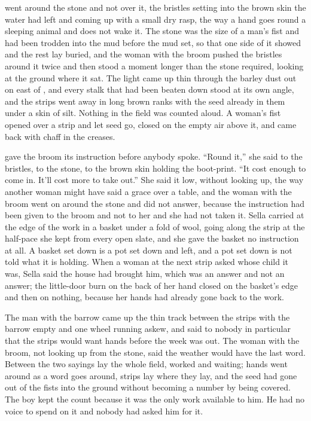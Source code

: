 
 went around the stone and not over it, the bristles setting into the brown skin the water had left and coming up with a small dry rasp, the way a hand goes round a sleeping animal and does not wake it. The stone was the size of a man's fist and had been trodden into the mud before the mud set, so that one side of it showed and the rest lay buried, and the woman with the broom pushed the bristles around it twice and then stood a moment longer than the stone required, looking at the ground where it sat. The light came up thin through the barley dust out on  east of , and every stalk that had been beaten down stood at its own angle, and the strips went away in long brown ranks with the seed already in them under a skin of silt. Nothing in the field was counted aloud. A woman's fist opened over a strip and let seed go, closed on the empty air above it, and came back with chaff in the creases.

 gave the broom its instruction before anybody spoke. “Round it,” she said to the bristles, to the stone, to the brown skin holding the boot-print. “It cost enough to come in. It'll cost more to take out.” She said it low, without looking up, the way another woman might have said a grace over a table, and the woman with the broom went on around the stone and did not answer, because the instruction had been given to the broom and not to her and she had not taken it. Sella carried  at the edge of the work in a basket under a fold of wool, going along the strip at the half-pace she kept from every open slate, and she gave the basket no instruction at all. A basket set down is a pot set down and left, and a pot set down is not told what it is holding. When a woman at the next strip asked whose child it was, Sella said the house had brought him, which was an answer and not an answer; the little-door burn on the back of her hand closed on the basket's edge and then on nothing, because her hands had already gone back to the work.

The man with the barrow came up the thin track between the strips with the barrow empty and one wheel running askew, and said to nobody in particular that the strips would want hands before the week was out. The woman with the broom, not looking up from the stone, said the weather would have the last word. Between the two sayings lay the whole field, worked and waiting; hands went around as a word goes around, strips lay where they lay, and the seed had gone out of the fists into the ground without becoming a number by being covered. The boy kept the count because it was the only work available to him. He had no voice to spend on it and nobody had asked him for it.

